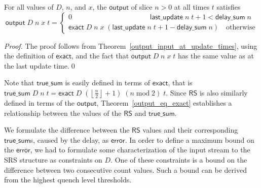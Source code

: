\documentclass{llncs}
\begin{document}
\begin{theorem}\label{output_eq_exact}
For all values of $D$, $n$, and $x$, the $\mathsf{output}$ of slice $n>0$ at all times $t$ satisfies
\begin{equation*}
\mathsf{output}\;D\;n\;x\;t=\begin{cases}0\qquad\qquad\qquad\qquad\qquad\quad\mathsf{last\_update}\;n\;t+1<\mathsf{delay\_sum}\;n\\\mathsf{exact}\;D\;n\;x\;(\mathsf{last\_update}\;n\;t+1-\mathsf{delay\_sum}\;n)\quad\text{otherwise}\end{cases}
\end{equation*}
\end{theorem}
\begin{proof}
The proof follows from Theorem~\ref{output_input_at_update_times}, using the definition of $\mathsf{exact}$, and the fact that $\mathsf{output}\;D\;n\;x\;t$ has the same value as at the last update time.\qed
\end{proof}

Note that $\mathsf{true\_sum}$ is easily defined in terms of $\mathsf{exact}$, that is $\mathsf{true\_sum}\;D\;n\;t = \mathsf{exact}\;D\;\left(\left\lfloor\frac{n}{2}\right\rfloor+1\right)\;(n\operatorname{mod}2)\;t$.
Since $\mathsf{RS}$ is also similarly defined in terms of the $\mathsf{output}$, Theorem~\ref{output_eq_exact} establishes a relationship between the values of the $\mathsf{RS}$ and $\mathsf{true\_sum}$.

We formulate the difference between the $\mathsf{RS}$ values and their corresponding $\mathsf{true\_sum}$s, caused by the delay, as $\mathsf{error}$.
In order to define a maximum bound on the $\mathsf{error}$, we had to formulate some characterization of the input stream to the SRS structure as constraints on $D$.
One of these constraints is a bound on the difference between two consecutive count values.
Such a bound can be derived from the highest quench level thresholds.
\end{document}
